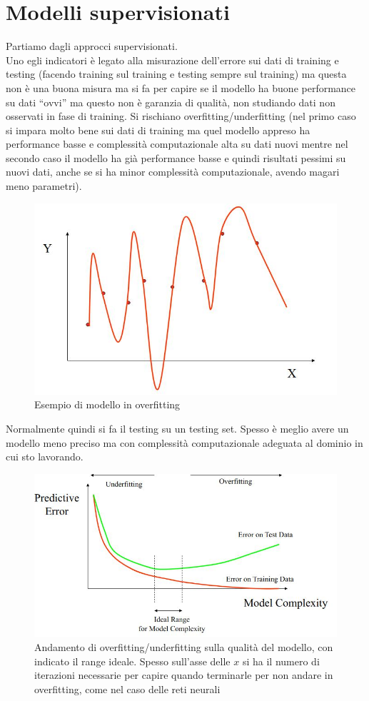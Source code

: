 \section{Modelli supervisionati}
Partiamo dagli approcci supervisionati. \\
Uno egli indicatori è legato alla misurazione dell'errore sui dati di training e
testing (facendo training sul training e testing sempre sul training) ma questa
non è una buona misura ma si fa per capire se il modello ha buone performance su
dati ``ovvi'' ma questo non è garanzia di qualità, non studiando dati non
osservati in fase di training. Si rischiano overfitting/underfitting (nel primo
caso si impara molto bene sui dati di training ma quel modello appreso ha
performance basse e complessità computazionale alta su dati nuovi mentre nel
secondo caso il modello ha già performance basse e quindi risultati pessimi su
nuovi dati, anche se si ha minor complessità computazionale, avendo magari meno
parametri).
\begin{figure}
  \centering
  \includegraphics[scale = 0.3]{img/of.jpg}
  \caption{Esempio di modello in overfitting}
  \label{fig:over}
\end{figure}
Normalmente quindi si fa il testing su un testing set. Spesso è meglio avere un
modello meno preciso ma con complessità computazionale adeguata al dominio in
cui sto lavorando.
\begin{figure}
  \centering
  \includegraphics[scale = 0.5]{img/of2.jpg}
  \caption{Andamento di overfitting/underfitting sulla qualità del modello, con
    indicato il range ideale. Spesso sull'asse delle $x$ si ha il numero di
    iterazioni necessarie per capire quando terminarle per non andare in
    overfitting, come nel caso delle reti neurali}
  \label{fig:over2}
\end{figure}
